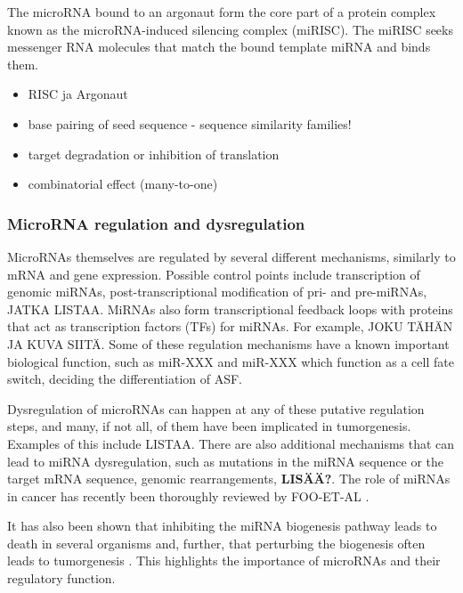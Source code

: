 The microRNA bound to an argonaut form the core part of a protein complex
known as the microRNA-induced silencing complex (miRISC). The miRISC seeks
messenger RNA molecules that match the bound template miRNA and binds them.

\begin{itemize}
\tightlist
\item
  RISC ja Argonaut
\item
  base pairing of seed sequence - sequence similarity families!
\item
  target degradation or inhibition of translation
\item
  combinatorial effect (many-to-one)
\end{itemize}





\subsubsection{MicroRNA regulation and dysregulation}\label{microrna-
regulation-and-dysregulation}

MicroRNAs themselves are regulated by several different mechanisms, similarly
to mRNA and gene expression. Possible control points include transcription of
genomic miRNAs, post-transcriptional modification of pri- and pre-miRNAs,
JATKA LISTAA. MiRNAs also form transcriptional feedback loops with proteins
that act as transcription factors (TFs) for miRNAs. For example, JOKU TÄHÄN JA
KUVA SIITÄ. Some of these regulation mechanisms have a known important
biological function, such as miR-XXX and miR-XXX which function as a cell fate
switch, deciding the differentiation of ASF.

Dysregulation of microRNAs can happen at any of these putative regulation
steps, and many, if not all, of them have been implicated in tumorgenesis.
Examples of this include LISTAA. There are also additional mechanisms that can
lead to miRNA dysregulation, such as mutations in the miRNA sequence or the
target mRNA sequence, genomic rearrangements,
\textbf{LISÄÄ?}. The role of miRNAs in cancer has recently been
thoroughly reviewed by FOO-ET-AL \citep{CITE}.

It has also been shown that inhibiting the miRNA biogenesis pathway leads to
death in several organisms \citep{CITE} and, further, that perturbing the
biogenesis often leads to tumorgenesis \citep{CITE}. This highlights the
importance of microRNAs and their regulatory function.










